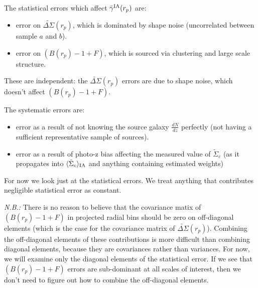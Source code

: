 \documentclass[onecolumn,amsmath,aps,fleqn, superscriptaddress]{revtex4}
\begin{document}
The statistical errors which affect $\bar{\gamma}^{\rm IA}(r_p)$ are:
\begin{itemize}
\item{error on $\widetilde{\Delta\Sigma}(r_p)$, which is dominated by shape noise (uncorrelated between sample $a$ and $b$).}
\item{error on $(B(r_p)-1+F)$, which is sourced via clustering and large scale structure.}
\end{itemize}
These are independent: the $\widetilde{\Delta\Sigma}(r_p)$ errors are due to shape noise, which doesn't affect $(B(r_p)-1+F)$.

The systematic errors are:
\begin{itemize}
\item{error as a result of not knowing the source galaxy $\frac{dN}{dz}$ perfectly (not having a sufficient representative sample of sources).}
\item{error as a result of photo-z bias affecting the measured value of $\tilde{\Sigma}_c$ (as it propagates into $\langle \tilde{\Sigma}_c\rangle_{\rm IA}$ and anything containing estimated weights)}
\end{itemize}
For now we look just at the statistical errors. We treat anything that contributes negligible statistical error as constant. 

{\it N.B.:} There is no reason to believe that the covariance matix of $(B(r_p)-1+F)$ in projected radial bins should be zero on off-diagonal elements (which is the case for the covariance matrix of $\widetilde{\Delta\Sigma}(r_p)$). Combining the off-diagonal elements of these contributions is more difficult than combining diagonal elements, because they are covariances rather than variances. For now, we will examine only the diagonal elements of the statistical error. If we see that $(B(r_p)-1+F)$ errors are sub-dominant at all scales of interest, then we don't need to figure out how to combine the off-diagonal elements.  
\end{document}
